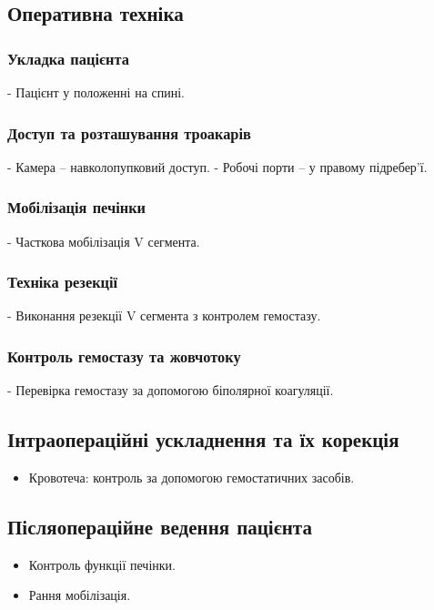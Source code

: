 \begin{refsection}
\subsection{Оперативна техніка}
\subsubsection{Укладка пацієнта}
- Пацієнт у положенні на спині.

\subsubsection{Доступ та розташування троакарів}
- Камера – навколопупковий доступ.
- Робочі порти – у правому підребер'ї.

\subsubsection{Мобілізація печінки}
- Часткова мобілізація V сегмента.

\subsubsection{Техніка резекції}
- Виконання резекції V сегмента з контролем гемостазу.

\subsubsection{Контроль гемостазу та жовчотоку}
- Перевірка гемостазу за допомогою біполярної коагуляції.

\subsection{Інтраопераційні ускладнення та їх корекція}
\begin{itemize}
    \item Кровотеча: контроль за допомогою гемостатичних засобів.
\end{itemize}

\subsection{Післяопераційне ведення пацієнта}
\begin{itemize}
    \item Контроль функції печінки.
    \item Рання мобілізація.
\end{itemize}


\end{refsection}
